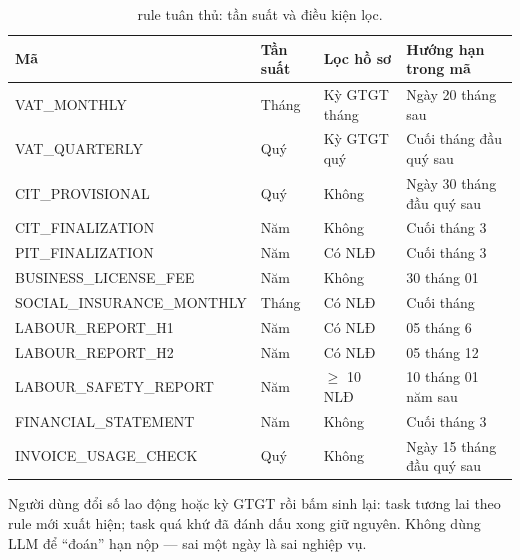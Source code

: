 \begin{table}[htp]
\centering
\caption{\soRule{} rule tuân thủ: tần suất và điều kiện lọc.}
\label{tab:12-rule}
\begin{tabular}{p{3.6cm}p{2.2cm}p{2.4cm}p{5.2cm}}
\toprule
\textbf{Mã} & \textbf{Tần suất} & \textbf{Lọc hồ sơ} & \textbf{Hướng hạn trong mã} \\
\midrule
VAT\_MONTHLY & Tháng & Kỳ GTGT tháng & Ngày 20 tháng sau \\
VAT\_QUARTERLY & Quý & Kỳ GTGT quý & Cuối tháng đầu quý sau \\
CIT\_PROVISIONAL & Quý & Không & Ngày 30 tháng đầu quý sau \\
CIT\_FINALIZATION & Năm & Không & Cuối tháng 3 \\
PIT\_FINALIZATION & Năm & Có NLĐ & Cuối tháng 3 \\
BUSINESS\_LICENSE\_FEE & Năm & Không & 30 tháng 01 \\
SOCIAL\_INSURANCE\_MONTHLY & Tháng & Có NLĐ & Cuối tháng \\
LABOUR\_REPORT\_H1 & Năm & Có NLĐ & 05 tháng 6 \\
LABOUR\_REPORT\_H2 & Năm & Có NLĐ & 05 tháng 12 \\
LABOUR\_SAFETY\_REPORT & Năm & $\ge$ 10 NLĐ & 10 tháng 01 năm sau \\
FINANCIAL\_STATEMENT & Năm & Không & Cuối tháng 3 \\
INVOICE\_USAGE\_CHECK & Quý & Không & Ngày 15 tháng đầu quý sau \\
\bottomrule
\end{tabular}
\end{table}

Người dùng đổi số lao động hoặc kỳ GTGT rồi bấm sinh lại: task tương lai theo
rule mới xuất hiện; task quá khứ đã đánh dấu xong giữ nguyên. Không dùng LLM để
``đoán'' hạn nộp --- sai một ngày là sai nghiệp vụ.
